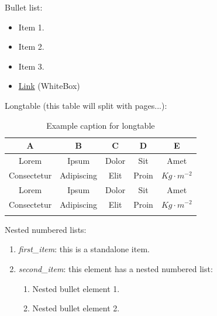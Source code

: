 \documentclass[12pt]{article}
\begin{document}
Bullet list:

\begin{itemize}
	
	\item Item 1.
	
	\item Item 2.
	
	\item Item 3.
	
	\item \href{https://whiteboxml.com}
	{Link} (WhiteBox)
	
\end{itemize}

Longtable (this table will split with pages...):

\begin{longtable}[H]{|c|c|c|c|c|} 
		\hline
		\textbf{A} 			& \textbf{B} 			& \textbf{C} 	 & \textbf{D} 				& \textbf{E} 		  \\ \hline 
		\endhead
		Lorem        		& Ipsum            		& Dolor          & Sit               		& Amet                 \\ \hline
		Consectetur         & Adipiscing            & Elit           & Proin                    & ${Kg \cdot m^{-2}}$  \\ \hline
		Lorem        		& Ipsum            		& Dolor          & Sit               		& Amet                 \\ \hline
		Consectetur         & Adipiscing            & Elit           & Proin                    & ${Kg \cdot m^{-2}}$  \\ \hline
\caption{Example caption for longtable}
\end{longtable}

Nested numbered lists:

\begin{enumerate}
	
	\item \textit{first\_item}: this is a standalone item.
	
	\item \textit{second\_item}: this element has a nested numbered list:
	
	\begin{enumerate}
		
		\item Nested bullet element 1.
		\item Nested bullet element 2.

	\end{enumerate}
	
\end{enumerate}
\end{document}
